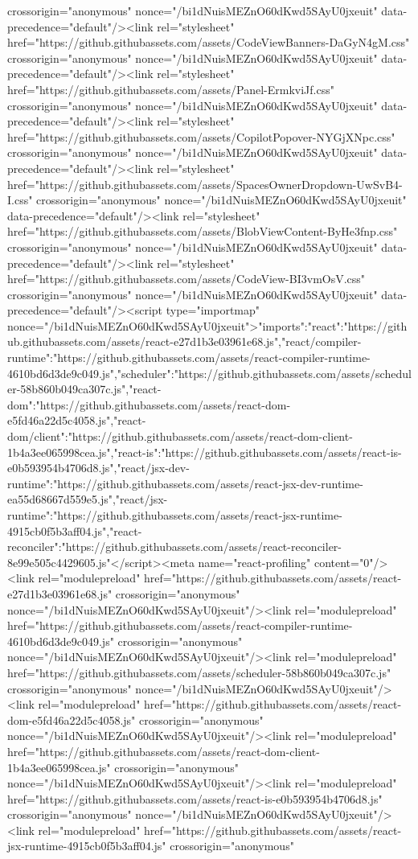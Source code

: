 crossorigin="anonymous" nonce="/bi1dNuisMEZnO60dKwd5SAyU0jxeuit" data-precedence="default"/><link rel="stylesheet" href="https://github.githubassets.com/assets/CodeViewBanners-DaGyN4gM.css" crossorigin="anonymous" nonce="/bi1dNuisMEZnO60dKwd5SAyU0jxeuit" data-precedence="default"/><link rel="stylesheet" href="https://github.githubassets.com/assets/Panel-ErmkviJf.css" crossorigin="anonymous" nonce="/bi1dNuisMEZnO60dKwd5SAyU0jxeuit" data-precedence="default"/><link rel="stylesheet" href="https://github.githubassets.com/assets/CopilotPopover-NYGjXNpc.css" crossorigin="anonymous" nonce="/bi1dNuisMEZnO60dKwd5SAyU0jxeuit" data-precedence="default"/><link rel="stylesheet" href="https://github.githubassets.com/assets/SpacesOwnerDropdown-UwSvB4-I.css" crossorigin="anonymous" nonce="/bi1dNuisMEZnO60dKwd5SAyU0jxeuit" data-precedence="default"/><link rel="stylesheet" href="https://github.githubassets.com/assets/BlobViewContent-ByHe3fnp.css" crossorigin="anonymous" nonce="/bi1dNuisMEZnO60dKwd5SAyU0jxeuit" data-precedence="default"/><link rel="stylesheet" href="https://github.githubassets.com/assets/CodeView-BI3vmOsV.css" crossorigin="anonymous" nonce="/bi1dNuisMEZnO60dKwd5SAyU0jxeuit" data-precedence="default"/><script type="importmap" nonce="/bi1dNuisMEZnO60dKwd5SAyU0jxeuit">{"imports":{"react":"https://github.githubassets.com/assets/react-e27d1b3e03961e68.js","react/compiler-runtime":"https://github.githubassets.com/assets/react-compiler-runtime-4610bd6d3de9c049.js","scheduler":"https://github.githubassets.com/assets/scheduler-58b860b049ca307c.js","react-dom":"https://github.githubassets.com/assets/react-dom-e5fd46a22d5c4058.js","react-dom/client":"https://github.githubassets.com/assets/react-dom-client-1b4a3ee065998cea.js","react-is":"https://github.githubassets.com/assets/react-is-e0b593954b4706d8.js","react/jsx-dev-runtime":"https://github.githubassets.com/assets/react-jsx-dev-runtime-ea55d68667d559e5.js","react/jsx-runtime":"https://github.githubassets.com/assets/react-jsx-runtime-4915cb0f5b3aff04.js","react-reconciler":"https://github.githubassets.com/assets/react-reconciler-8e99e505c4429605.js"}}</script><meta name="react-profiling" content="0"/><link rel="modulepreload" href="https://github.githubassets.com/assets/react-e27d1b3e03961e68.js" crossorigin="anonymous" nonce="/bi1dNuisMEZnO60dKwd5SAyU0jxeuit"/><link rel="modulepreload" href="https://github.githubassets.com/assets/react-compiler-runtime-4610bd6d3de9c049.js" crossorigin="anonymous" nonce="/bi1dNuisMEZnO60dKwd5SAyU0jxeuit"/><link rel="modulepreload" href="https://github.githubassets.com/assets/scheduler-58b860b049ca307c.js" crossorigin="anonymous" nonce="/bi1dNuisMEZnO60dKwd5SAyU0jxeuit"/><link rel="modulepreload" href="https://github.githubassets.com/assets/react-dom-e5fd46a22d5c4058.js" crossorigin="anonymous" nonce="/bi1dNuisMEZnO60dKwd5SAyU0jxeuit"/><link rel="modulepreload" href="https://github.githubassets.com/assets/react-dom-client-1b4a3ee065998cea.js" crossorigin="anonymous" nonce="/bi1dNuisMEZnO60dKwd5SAyU0jxeuit"/><link rel="modulepreload" href="https://github.githubassets.com/assets/react-is-e0b593954b4706d8.js" crossorigin="anonymous" nonce="/bi1dNuisMEZnO60dKwd5SAyU0jxeuit"/><link rel="modulepreload" href="https://github.githubassets.com/assets/react-jsx-runtime-4915cb0f5b3aff04.js" crossorigin="anonymous" 